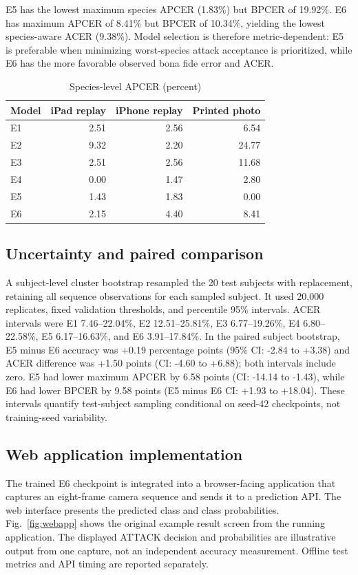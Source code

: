 \documentclass[a4paper,conference]{IEEEtran}
\begin{document}
E5 has the lowest maximum species APCER (1.83\%) but BPCER of 19.92\%. E6 has maximum APCER of 8.41\% but BPCER of 10.34\%, yielding the lowest species-aware ACER (9.38\%). Model selection is therefore metric-dependent: E5 is preferable when minimizing worst-species attack acceptance is prioritized, while E6 has the more favorable observed bona fide error and ACER.

\begin{table}[t]
\caption{Species-level APCER (percent)}\label{tab:species}\centering\footnotesize
\begin{tabular}{lrrr}\toprule
Model & iPad replay & iPhone replay & Printed photo\\\midrule
E1 & 2.51 & 2.56 & 6.54\\
E2 & 9.32 & 2.20 & 24.77\\
E3 & 2.51 & 2.56 & 11.68\\
E4 & 0.00 & 1.47 & 2.80\\
E5 & 1.43 & 1.83 & 0.00\\
E6 & 2.15 & 4.40 & 8.41\\
\bottomrule\end{tabular}
\end{table}

\subsection{Uncertainty and paired comparison}
A subject-level cluster bootstrap resampled the 20 test subjects with replacement, retaining all sequence observations for each sampled subject. It used 20,000 replicates, fixed validation thresholds, and percentile 95\% intervals. ACER intervals were E1 7.46--22.04\%, E2 12.51--25.81\%, E3 6.77--19.26\%, E4 6.80--22.58\%, E5 6.17--16.63\%, and E6 3.91--17.84\%. In the paired subject bootstrap, E5 minus E6 accuracy was +0.19 percentage points (95\% CI: -2.84 to +3.38) and ACER difference was +1.50 points (CI: -4.60 to +6.88); both intervals include zero. E5 had lower maximum APCER by 6.58 points (CI: -14.14 to -1.43), while E6 had lower BPCER by 9.58 points (E5 minus E6 CI: +1.93 to +18.04). These intervals quantify test-subject sampling conditional on seed-42 checkpoints, not training-seed variability.

\subsection{Web application implementation}
The trained E6 checkpoint is integrated into a browser-facing application that captures an eight-frame camera sequence and sends it to a prediction API. The web interface presents the predicted class and class probabilities. Fig.~\ref{fig:webapp} shows the original example result screen from the running application. The displayed ATTACK decision and probabilities are illustrative output from one capture, not an independent accuracy measurement. Offline test metrics and API timing are reported separately.
\end{document}
